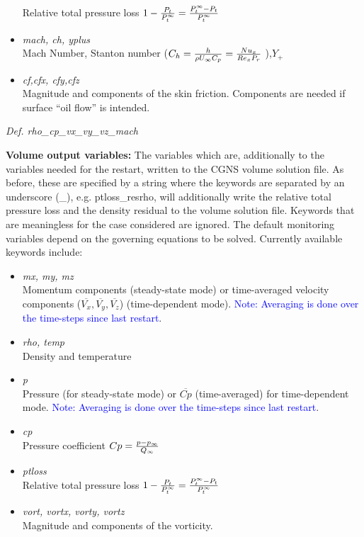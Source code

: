 \documentclass[12pt,epsf,colordvi]{article}
\begin{document}
\begin{description}
\begin{itemize}
Relative total pressure loss \(1-{P_t \over P_t^\infty }={{P_t^\infty - P_t } \over P_t^\infty } \)
			\item {\it mach, ch, yplus} \\
Mach Number, Stanton number (\(C_h = { h \over { \rho U_\infty C_p }} = {{Nu_x} \over {Re_x P_r }} \) ),\(Y_+\)
			\item {\it cf,cfx, cfy,cfz } \\
Magnitude and components of the skin friction. Components are needed if surface ``oil flow'' is intended.
		\end{itemize}
	{\it Def.  rho\_cp\_vx\_vy\_vz\_mach}
%
	\item{\bf Volume output variables:} 
The variables which are, additionally to the variables needed for the restart, written to the CGNS volume solution file. As before, these are specified by a string where the keywords are separated by an underscore (\_), e.g. ptloss\_resrho, will additionally write the relative total pressure loss and the density residual to the volume solution file. Keywords that are meaningless for the case considered are ignored. The default monitoring variables depend on the governing equations to be solved. Currently available keywords include: 
		\begin{itemize}
			\item {\it	mx, my, mz } \\
Momentum components (steady-state mode) or time-averaged velocity components (\(\overline{V_x},\overline{V_y}, \overline{V_z}\)) (time-dependent mode). \textcolor{blue}{Note: Averaging is done over the time-steps since last restart}.
			\item {\it rho,  temp } \\
Density and temperature
			\item {\it p } \\
Pressure (for steady-state mode) or \(\overline{Cp}\) (time-averaged) for time-dependent mode.  \textcolor{blue}{Note: Averaging is done over the time-steps since last restart}.
%
			\item {\it cp } \\
Pressure coefficient \(Cp={{p - p_\infty } \over Q_\infty } \)
%
			\item {\it ptloss } \\
Relative total pressure loss \(1-{P_t \over P_t^\infty }={{P_t^\infty - P_t } \over P_t^\infty } \)
%
			\item	{\it vort, vortx, vorty, vortz } \\
Magnitude and components of the vorticity.

\end{itemize}
\end{description}
\end{document}
